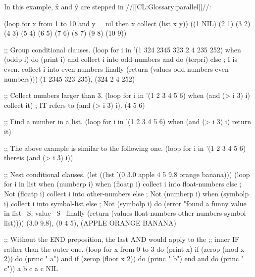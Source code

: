 In this example, \f{x} and \f{y} are stepped in //[[CL:Glossary:parallel]]//:
 
\code
 (loop for x from 1 to 10 
       and y = nil then x 
       collect (list x y))
\EV ((1 NIL) (2 1) (3 2) (4 3) (5 4) (6 5) (7 6) (8 7) (9 8) (10 9))
\endcode

\code
;; Group conditional clauses.
 (loop for i in '(1 324 2345 323 2 4 235 252)
       when (oddp i)
         do (print i)
         and collect i into odd-numbers
         and do (terpri)
       else                              ; I is even.
         collect i into even-numbers
       finally
         (return (values odd-numbers even-numbers)))
\OUT 
{} 
\OUT 
{} 
\OUT 
{} 
\EV (1 2345 323 235), (324 2 4 252)

;; Collect numbers larger than 3.
 (loop for i in '(1 2 3 4 5 6)
       when (and (> i 3) i)
       collect it)                      ; IT refers to (and (> i 3) i).
\EV (4 5 6)
 
;; Find a number in a list.
 (loop for i in '(1 2 3 4 5 6)
       when (and (> i 3) i)
       return it)
     
;; The above example is similar to the following one.
 (loop for i in '(1 2 3 4 5 6)
       thereis (and (> i 3) i))

\medbreak
;; Nest conditional clauses.
 (let ((list '(0 3.0 apple 4 5 9.8 orange banana)))
   (loop for i in list
         when (numberp i)
           when (floatp i)
             collect i into float-numbers
           else                                  ; Not (floatp i)
             collect i into other-numbers
         else                                    ; Not (numberp i)
           when (symbolp i) 
             collect i into symbol-list
           else                                  ; Not (symbolp i)
             do (error "found a funny value in list ~S, value ~S~%
         finally (return (values float-numbers other-numbers symbol-list))))
\EV (3.0 9.8), (0 4 5), (APPLE ORANGE BANANA)

;; Without the END preposition, the last AND would apply to the
;; inner IF rather than the outer one.
 (loop for x from 0 to 3 
       do (print x)
       if (zerop (mod x 2))
         do (princ " a")
          and if (zerop (floor x 2))
                do (princ " b")
                end
          and do (princ " c"))
  a b c
  a c
\EV NIL
\endcode
 
\endsubsubsection%

